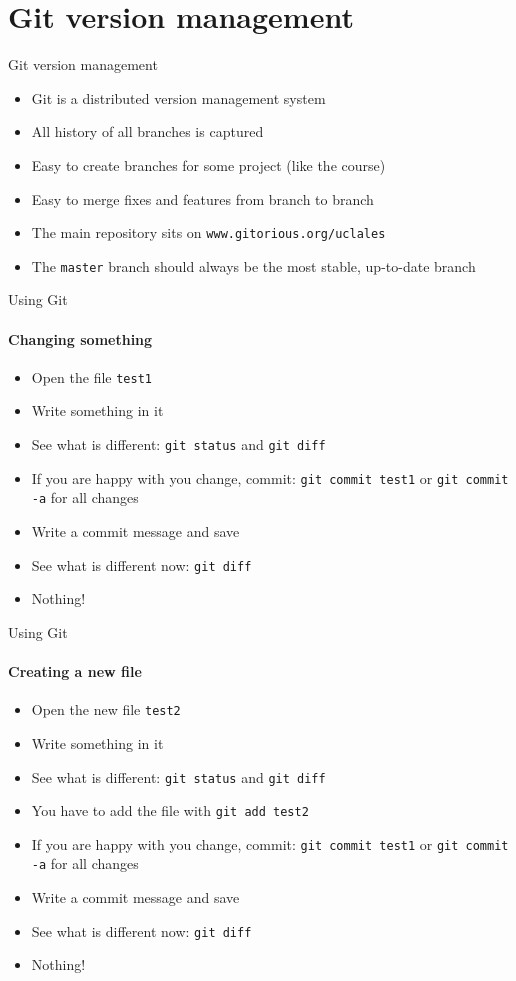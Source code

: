 \documentclass[handout]{beamer}
\newcommand{\code}[1]{{\tt #1}}
\begin{document}
\section[Git]{Git version management}
\begin{frame}{Git version management}
 \begin{itemize}
  \item Git is a distributed version management system
  \item All history of all branches is captured
  \item Easy to create branches for some project (like the course)
  \item Easy to merge fixes and features from branch to branch
  \item The main repository sits on \code{www.gitorious.org/uclales}
  \item The \code{master} branch should always be the most stable, up-to-date branch
 \end{itemize}

\end{frame}
\begin{frame}[<+->]{Using Git}
\framesubtitle{Changing something}
\begin{itemize}
\item Open the file \code{test1}
\item Write something in it
\item See what is different: \code{git status} and \code{git diff}
\item If you are happy with you change, commit: \code{git commit test1} or \code{git commit -a} for all changes
\item Write a commit message and save
\item See what is different now: \code{git diff}
\item Nothing!
\end{itemize}
\end{frame}
\begin{frame}[<+->]{Using Git}
\framesubtitle{Creating a new file}
\begin{itemize}
\item Open the new file \code{test2}
\item Write something in it
\item See what is different: \code{git status} and \code{git diff}
\item You have to add the file with \code{git add test2}
\item If you are happy with you change, commit: \code{git commit test1} or \code{git commit -a} for all changes
\item Write a commit message and save
\item See what is different now: \code{git diff}
\item Nothing!
\end{itemize}
\end{frame}
\end{document}
